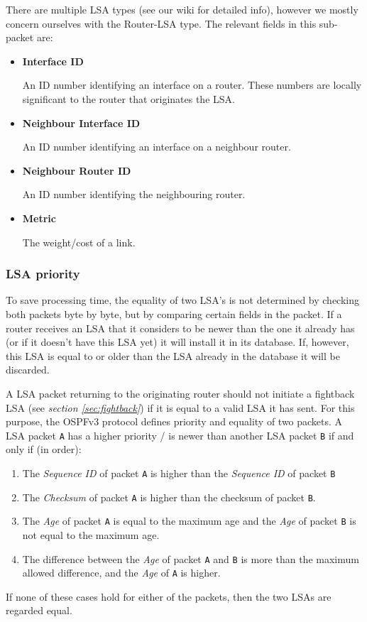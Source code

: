 \documentclass[11pt,a4paper,oneside]{article}
\newcommand{\lsubsubsection}[2]{\subsubsection{#1}\label{sec:#2}}
\begin{document}
    There are multiple LSA types (see our wiki\cite{wiki} for detailed info), however we mostly concern ourselves with the Router-LSA type. The relevant fields in this sub-packet are:
    \begin{itemize}
        \item \textbf{Interface ID}

        An ID number identifying an interface on a router.
        These numbers are locally significant to the router that originates the LSA.

        \item \textbf{Neighbour Interface ID}

        An ID number identifying an interface on a neighbour router.
        \item \textbf{Neighbour Router ID}

        An ID number identifying the neighbouring router.
        \item \textbf{Metric}

        The weight/cost of a link.
    \end{itemize}

    \lsubsubsection{LSA priority}{lsa_priority}
    To save processing time, the equality of two LSA's is not determined by checking both packets byte by byte, but by comparing certain fields in the packet.
    If a router receives an LSA that it considers to be newer than the one it already has (or if it doesn't have this LSA yet) it will install it in its database.
    If, however, this LSA is equal to or older than the LSA already in the database it will be discarded.

    A LSA packet returning to the originating router should not initiate a fightback LSA (see \textit{section \ref{sec:fightback}}) if it is equal to a valid LSA it has sent.
    For this purpose, the OSPFv3 protocol defines priority and equality of two packets.
    A LSA packet \texttt{A} has a higher priority / is newer than another LSA packet \texttt{B} if and only if (in order):
    \begin{enumerate}
        \item The \textit{Sequence ID} of packet \texttt{A} is higher than the \textit{Sequence ID} of packet \texttt{B}
        \item The \textit{Checksum} of packet \texttt{A} is higher than the checksum of packet \texttt{B}.
        \item The \textit{Age} of packet \texttt{A} is equal to the maximum age and the \textit{Age} of packet \texttt{B} is not equal to the maximum age.
        \item The difference between the \textit{Age} of packet \texttt{A} and \texttt{B} is more than the maximum allowed difference, and the \textit{Age} of \texttt{A} is higher.
    \end{enumerate}
    If none of these cases hold for either of the packets, then the two LSAs are regarded equal.
\end{document}
